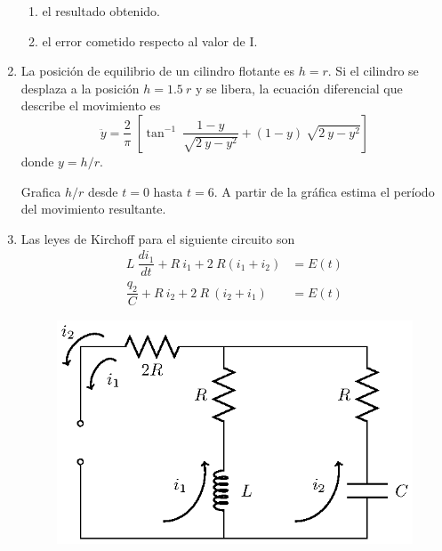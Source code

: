\documentclass[11pt]{article}
\begin{document}
\begin{enumerate}
\begin{enumerate}
\item el resultado obtenido.
\item el error cometido respecto al valor de I.
\end{enumerate}
\item La posición de equilibrio de un cilindro flotante es $h = r$. Si el cilindro se desplaza a la posición $h = 1.5 \: r$ y se libera, la ecuación diferencial que describe el movimiento es
\[ \ddot{y} = \dfrac{2}{\pi} \: \left[ \tan^{-1} \: \dfrac{1 - y}{\sqrt{2 \: y - y^{2}}} + (1 - y) \: \sqrt{2 \: y - y^{2}} \right] \]
donde $y = h / r$.
\begin{figure}[H]
\centering
{}
\end{figure}
Grafica $h/r$ desde $t = 0$ hasta $t = 6$. A partir de la gráfica estima el período del movimiento resultante.
\item Las leyes de Kirchoff para el siguiente circuito son
\begin{align}
L \: \dfrac{d i_{1}}{dt} +  R \: i_{1} + 2 \: R (i_{1} + i_{2}) &=  E(t) \label{eq:ecuacion_a} \\
\dfrac{q_{2}}{C} + R \: i_{2} + 2 \: R \: (i_{2} + i_{1}) &= E(t) \label{eq:ecuacion_b}
\end{align}
\begin{figure}[H]
	\centering
	\includegraphics[scale=1.3]{Figuras/circuito_reposicion_01.eps}

\end{figure}
\end{enumerate}
\end{document}
